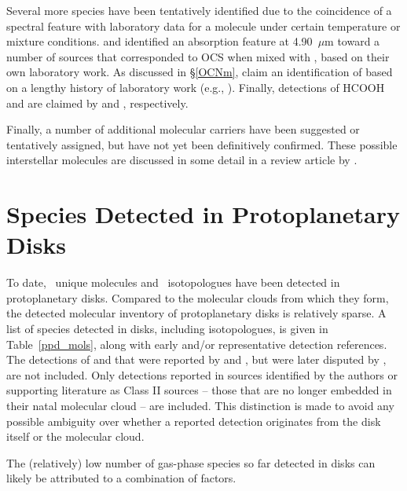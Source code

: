 \documentclass[twocolumn]{aastex631}
\newcommand{\update}[1]{{#1}}
\newcommand{\nppds}{}
\newcommand{\nppdisos}{}
\begin{document}
Several more species have been tentatively identified due to the coincidence of a spectral feature with laboratory data for a molecule under certain temperature or mixture conditions.  \citet{1995ApJ...449..674P} and \citet{1997ApJ...479..839P} identified an absorption feature at 4.90~$\mu$m toward a number of sources that corresponded to OCS when mixed with , based on their own laboratory work.  As discussed in \S\ref{OCNm},  \citet{2005A&A...441..249V} claim an identification of  based on a lengthy history of laboratory work (e.g., \citealt{Schutte:1997hd}).  \update{Finally, detections of HCOOH and  are claimed by \citet{1999A&A...343..966S} and \citet{2001A&A...376..254K}, respectively.}

Finally, a number of additional molecular carriers have been suggested or tentatively assigned, but have not yet been definitively confirmed.  These possible interstellar molecules are discussed in some detail in a review article by \citet{Boogert:2015fx}.

\section{Species Detected in Protoplanetary Disks}
\label{ppds}

\update{To date, \nppds~unique molecules and \nppdisos~isotopologues have been detected in protoplanetary disks.}  Compared to the molecular clouds from which they form, the detected molecular inventory of protoplanetary disks is relatively sparse.  A list of species detected in disks, including isotopologues, is given in Table~\ref{ppd_mols}, along with early and/or representative detection references.  The detections of  and  that were reported by \citet{Ceccarelli:2004gf} and \citet{Ceccarelli:2005gq}, but were later disputed by \citet{Guilloteau:2006bw}, are not included.  \update{Only detections reported in sources identified by the authors or supporting literature as Class II sources -- those that are no longer embedded in their natal molecular cloud -- are included.  This distinction is made to avoid any possible ambiguity over whether a reported detection originates from the disk itself or the molecular cloud.}

The (relatively) low number of gas-phase species so far detected in disks can likely be attributed to a combination of factors.
\end{document}

